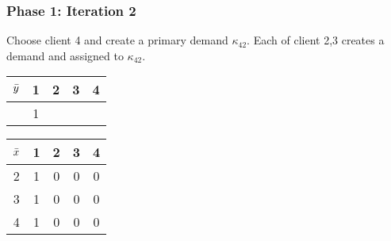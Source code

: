 \documentclass[hyperref, xcolor=dvipsnames]{beamer}
\begin{document}
\begin{frame}
  \frametitle{Phase 1: Iteration 2}

  Choose client 4 and create a primary demand $\kappa_{42}$. Each of
  client 2,3 creates a demand and assigned to $\kappa_{42}$.
  \begin{table}
  \begin{subtable}{0.5\textwidth}
    \centering
    \begin{tabular}{c | c c c c}
      ${\bar y}$ & 1 & 2 & 3 & 4\\
      \hline
      & 1 &  &  & \\
    \end{tabular}
  \end{subtable}
%
  \begin{subtable}{0.5\textwidth}
    \centering
    \begin{tabular}{c | c c c c}
      ${\bar x}$ & 1 & 2 & 3 & 4\\
      \hline
      2 & 1 & 0 & 0 & 0\\
      3 & 1 & 0 & 0 & 0\\
      4 & 1 & 0 & 0 & 0\\
    \end{tabular}
  \end{subtable}
\end{table}
\end{frame}
\end{document}

